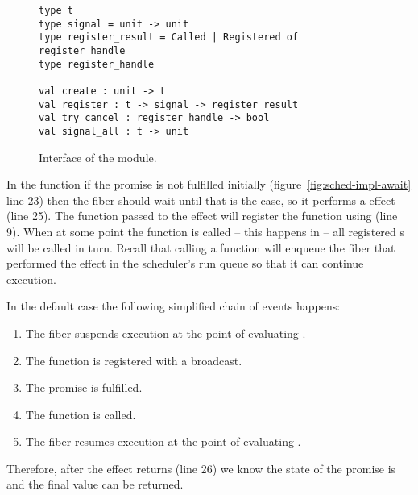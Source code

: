 \begin{figure}[ht]
  \begin{verbatim}
type t
type signal = unit -> unit
type register_result = Called | Registered of register_handle
type register_handle

val create : unit -> t
val register : t -> signal -> register_result
val try_cancel : register_handle -> bool
val signal_all : t -> unit
  \end{verbatim}
  \caption{Interface of the  module.}
  \label{fig:sched-impl-broadcast}
\end{figure}

In the  function if the promise is not fulfilled initially (figure~\ref{fig:sched-impl-await} line 23) then the fiber should wait until that is the case, so it performs a \esuspend{} effect (line 25).
The  function passed to the effect will register the  function using  (line 9).
When at some point the  function is called -- this happens in  -- all registered s will be called in turn.
Recall that calling a  function will enqueue the fiber that performed the \esuspend{} effect in the scheduler's run queue so that it can continue execution.

In the default case the following simplified chain of events happens:
\begin{enumerate}
  \item The fiber suspends execution at the point of evaluating .
  \item The  function is registered with a broadcast.
  \item The promise is fulfilled.
  \item The  function is called.
  \item The fiber resumes execution at the point of evaluating .
\end{enumerate}
Therefore, after the \esuspend{} effect returns (line 26) we know the state of the promise is  and the final value can be returned.

